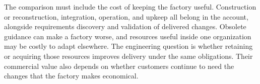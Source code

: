 
The comparison must include the cost of keeping the factory useful. Construction or reconstruction, integration, operation, and upkeep all belong in the account, alongside requirements discovery and validation of delivered changes. Obsolete guidance can make a factory worse, and resources useful inside one organization may be costly to adapt elsewhere. The engineering question is whether retaining or acquiring those resources improves delivery under the same obligations. Their commercial value also depends on whether customers continue to need the changes that the factory makes economical.

